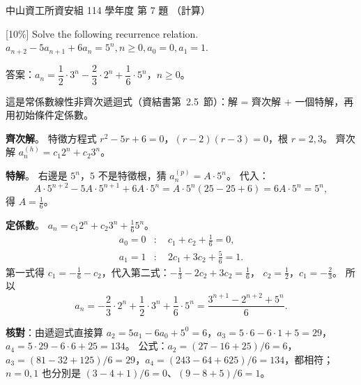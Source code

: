 \begin{pastexam}[label={px:nsysu-114-dmalg-06}]{中山資工所資安組 114 學年度 第 7 題}
（計算）

{[10\%]} Solve the following recurrence relation.
$a_{n+2} - 5a_{n+1} + 6a_n = 5^n, n \ge 0, a_0 = 0, a_1 = 1$.
\end{pastexam}

\begin{pastsoln}
答案：$a_n = \dfrac{1}{2}\cdot 3^n - \dfrac{2}{3}\cdot 2^n + \dfrac{1}{6}\cdot 5^n$，$n \ge 0$。

這是常係數線性非齊次遞迴式（資結書第~2.5~節）：解 = 齊次解 + 一個特解，再用初始條件定係數。

\textbf{齊次解}。 特徵方程式 $r^2 - 5r + 6 = 0$，$(r - 2)(r - 3) = 0$，根 $r = 2, 3$。 齊次解
$a_n^{(h)} = c_1 2^n + c_2 3^n$。

\textbf{特解}。 右邊是 $5^n$，$5$ 不是特徵根，猜 $a_n^{(p)} = A \cdot 5^n$。 代入：
\[
A \cdot 5^{n+2} - 5A \cdot 5^{n+1} + 6A \cdot 5^n = A \cdot 5^n (25 - 25 + 6) = 6A \cdot 5^n = 5^n,
\]
得 $A = \frac{1}{6}$。

\textbf{定係數}。 $a_n = c_1 2^n + c_2 3^n + \frac{1}{6} 5^n$。
\begin{align*}
a_0 = 0 &:\quad c_1 + c_2 + \tfrac{1}{6} = 0, \\
a_1 = 1 &:\quad 2c_1 + 3c_2 + \tfrac{5}{6} = 1 .
\end{align*}
第一式得 $c_1 = -\frac{1}{6} - c_2$，代入第二式：$-\frac{1}{3} - 2c_2 + 3c_2 = \frac{1}{6}$，
$c_2 = \frac{1}{2}$，$c_1 = -\frac{2}{3}$。 所以
\[
a_n = -\frac{2}{3}\cdot 2^n + \frac{1}{2}\cdot 3^n + \frac{1}{6}\cdot 5^n
= \frac{3^{n+1} - 2^{n+2} + 5^n}{6} .
\]

\textbf{核對}：由遞迴式直接算 $a_2 = 5a_1 - 6a_0 + 5^0 = 6$，$a_3 = 5 \cdot 6 - 6 \cdot 1 + 5 = 29$，
$a_4 = 5 \cdot 29 - 6 \cdot 6 + 25 = 134$。 公式：$a_2 = (27 - 16 + 25)/6 = 6$，
$a_3 = (81 - 32 + 125)/6 = 29$，$a_4 = (243 - 64 + 625)/6 = 134$，都相符；$n = 0, 1$ 也分別是
$(3 - 4 + 1)/6 = 0$、$(9 - 8 + 5)/6 = 1$。
\end{pastsoln}
